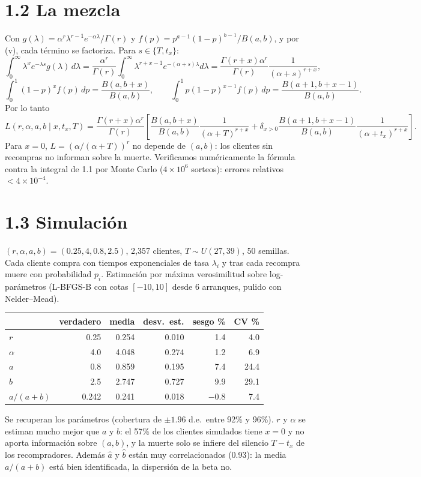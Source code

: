 \documentclass[11pt]{article}
\begin{document}
\section*{1.2 La mezcla}
Con $g(\lambda)=\alpha^r\lambda^{r-1}e^{-\alpha\lambda}/\Gamma(r)$ y $f(p)=p^{a-1}(1-p)^{b-1}/B(a,b)$, y por (v), cada término se factoriza. Para $s\in\{T,t_x\}$:
\[\int_0^\infty\lambda^xe^{-\lambda s}g(\lambda)\,d\lambda=\frac{\alpha^r}{\Gamma(r)}\int_0^\infty\lambda^{r+x-1}e^{-(\alpha+s)\lambda}d\lambda=\frac{\Gamma(r+x)\alpha^r}{\Gamma(r)}\frac{1}{(\alpha+s)^{r+x}},\]
\[\int_0^1(1-p)^xf(p)\,dp=\frac{B(a,b+x)}{B(a,b)},\qquad\int_0^1p(1-p)^{x-1}f(p)\,dp=\frac{B(a+1,b+x-1)}{B(a,b)}.\]
Por lo tanto
\[L(r,\alpha,a,b\mid x,t_x,T)=\frac{\Gamma(r+x)\alpha^r}{\Gamma(r)}\left[\frac{B(a,b+x)}{B(a,b)}\frac{1}{(\alpha+T)^{r+x}}+\delta_{x>0}\frac{B(a+1,b+x-1)}{B(a,b)}\frac{1}{(\alpha+t_x)^{r+x}}\right].\]
Para $x=0$, $L=(\alpha/(\alpha+T))^r$ no depende de $(a,b)$: los clientes sin recompras no informan sobre la muerte.
Verificamos numéricamente la fórmula contra la integral de 1.1 por Monte Carlo ($4\times10^6$ sorteos): errores relativos $<4\times10^{-4}$.

\section*{1.3 Simulación}
$(r,\alpha,a,b)=(0.25,4,0.8,2.5)$, 2{,}357 clientes, $T\sim U(27,39)$, 50 semillas. Cada cliente compra con tiempos exponenciales de tasa $\lambda_i$ y tras cada recompra muere con probabilidad $p_i$. Estimación por máxima verosimilitud sobre log-parámetros (L-BFGS-B con cotas $[-10,10]$ desde 6 arranques, pulido con Nelder--Mead).

\begin{center}
\begin{tabular}{lrrrrr}
\toprule
 & verdadero & media & desv.\ est. & sesgo \% & CV \%\\\midrule
$r$ & 0.25 & 0.254 & 0.010 & 1.4 & 4.0\\
$\alpha$ & 4.0 & 4.048 & 0.274 & 1.2 & 6.9\\
$a$ & 0.8 & 0.859 & 0.195 & 7.4 & 24.4\\
$b$ & 2.5 & 2.747 & 0.727 & 9.9 & 29.1\\
$a/(a+b)$ & 0.242 & 0.241 & 0.018 & $-0.8$ & 7.4\\\bottomrule
\end{tabular}
\end{center}
Se recuperan los parámetros (cobertura de $\pm1.96$ d.e.\ entre 92\% y 96\%). $r$ y $\alpha$ se estiman mucho mejor que $a$ y $b$: el 57\% de los clientes simulados tiene $x=0$ y no aporta información sobre $(a,b)$, y la muerte solo se infiere del silencio $T-t_x$ de los recompradores. Además $\widehat a$ y $\widehat b$ están muy correlacionados (0.93): la media $a/(a+b)$ está bien identificada, la dispersión de la beta no.
\end{document}

